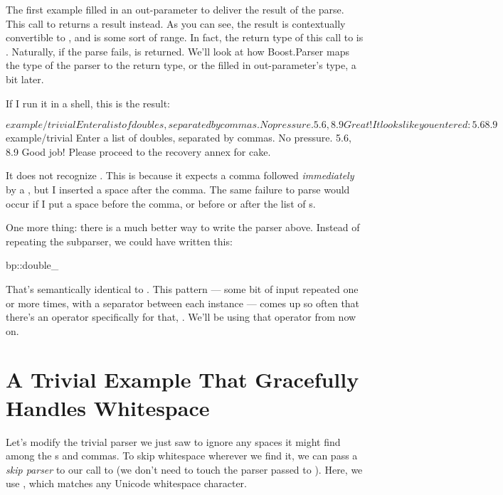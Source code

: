 \documentclass{MyBook}
\begin{document}
The first example filled in an out-parameter to deliver the result of the parse. This call to  returns a result instead. As you can see, the result is contextually convertible to , and  is some sort of range. In fact, the return type of this call to  is . Naturally, if the parse fails,  is returned. We'll look at how Boost.Parser maps the type of the parser to the return type, or the filled in out-parameter's type, a bit later.



If I run it in a shell, this is the result:

\begin{code}
$ example/trivial
Enter a list of doubles, separated by commas.  No pressure. 5.6,8.9
Great! It looks like you entered:
5.6
8.9
$ example/trivial
Enter a list of doubles, separated by commas.  No pressure. 5.6, 8.9
Good job!  Please proceed to the recovery annex for cake.
\end{code}

It does not recognize . This is because it expects a comma followed \emph{immediately} by a , but I inserted a space after the comma. The same failure to parse would occur if I put a space before the comma, or before or after the list of s.

One more thing: there is a much better way to write the parser above. Instead of repeating the  subparser, we could have written this:

\begin{code}
bp::double_ %
\end{code}

That's semantically identical to . This pattern --- some bit of input repeated one or more times, with a separator between each instance --- comes up so often that there's an operator specifically for that, . We'll be using that operator from now on.

\section{A Trivial Example That Gracefully Handles Whitespace}

Let's modify the trivial parser we just saw to ignore any spaces it might find among the s and commas. To skip whitespace wherever we find it, we can pass a \emph{skip parser} to our call to  (we don't need to touch the parser passed to ). Here, we use , which matches any Unicode whitespace character.
\end{document}
